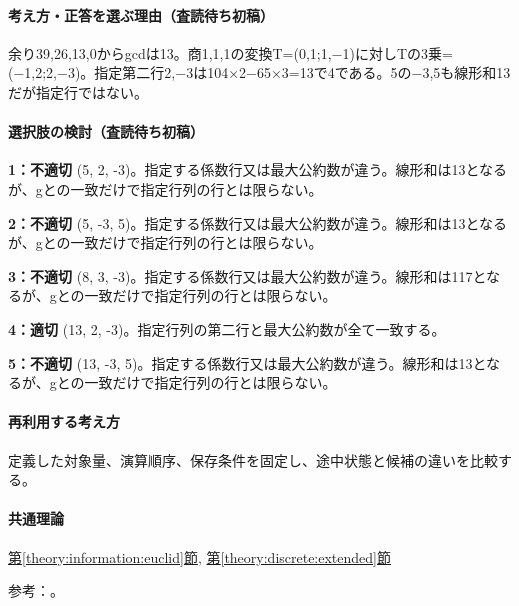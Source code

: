 \paragraph{考え方・正答を選ぶ理由（査読待ち初稿）} 余り39,26,13,0からgcdは13。商1,1,1の変換T=\allowbreak{}(0,1;1,−1)に対しTの3乗=(−1,2;2,−3)。指定第二行2,−3は104×2−65×3=\allowbreak{}13で4である。5の−3,5も線形和13だが指定行ではない。

\paragraph{選択肢の検討（査読待ち初稿）}\mbox{}\par

\noindent\textbf{1：不適切} (5, 2, -3)。指定する係数行又は最大公約数が違う。線形和は13となるが、gとの一致だけで指定行列の行とは限らない。\par

\noindent\textbf{2：不適切} (5, -3, 5)。指定する係数行又は最大公約数が違う。線形和は13となるが、gとの一致だけで指定行列の行とは限らない。\par

\noindent\textbf{3：不適切} (8, 3, -3)。指定する係数行又は最大公約数が違う。線形和は117となるが、gとの一致だけで指定行列の行とは限らない。\par

\noindent\textbf{4：適切} (13, 2, -3)。指定行列の第二行と最大公約数が全て一致する。\par

\noindent\textbf{5：不適切} (13, -3, 5)。指定する係数行又は最大公約数が違う。線形和は13となるが、gとの一致だけで指定行列の行とは限らない。\par

\paragraph{再利用する考え方} 定義した対象量、演算順序、保存条件を固定し、途中状態と候補の違いを比較する。

\paragraph{共通理論} \hyperref[theory:information:euclid]{第\ref*{theory:information:euclid}節}, \hyperref[theory:discrete:extended]{第\ref*{theory:discrete:extended}節}

\par 参考：\cite{mit_discrete2015}。

